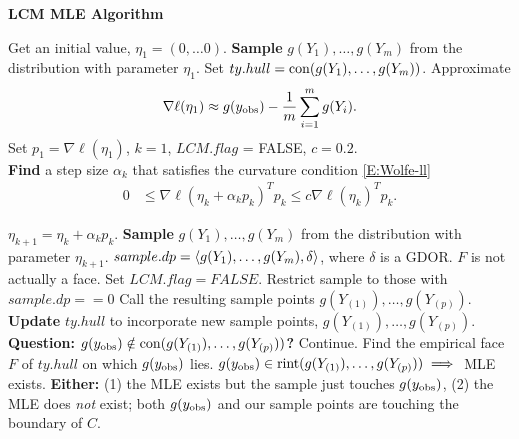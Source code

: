 {\small
\noindent \textbf{LCM MLE Algorithm}

\noindent \begin{algorithmic}[1]
\State Get an initial value, $\eta_1 = (0, \ldots 0)$.
\State \textbf{Sample} $g(Y_1), \ldots, g(Y_m)$ from the distribution with parameter $\eta_{1}$.  
\State Set $ty.hull = \operatorname{con}(g(Y_1), \ldots, g(Y_m) )$.
\State Approximate 
\begin{align*}
\nabla \ell( \eta_1) \approx g(y_{\text{obs}}) - \frac{1}{m}\sum_{i=1}^m g(Y_i).
\end{align*}
\State Set $p_1 = \nabla \ell( \eta_1)$, $k=1$, $LCM.flag$ = FALSE, $c=0.2$.\\

\State \textbf{Find} a step size $\alpha_k$ that satisfies the curvature condition \eqref{E:Wolfe-ll}
\begin{align*}%
	 0 & \leq \nabla \ell( \eta_k + \alpha_k p_k)^T p_k \leq c \nabla \ell(\eta_k)^T p_k.
\end{align*}

\State $\eta_{k+1} = \eta_k + \alpha_k p_k$.
\State \textbf{Sample} $g(Y_1), \ldots, g(Y_m)$ from the distribution with parameter $\eta_{k+1}$.
	\State $sample.dp = \langle  g(Y_1), \ldots, g(Y_m), \delta \rangle$, where $\delta$ is a GDOR.
		\State $F$ is not actually a face.  
		\State Set $LCM.flag = FALSE$.
	\Else
		\State Restrict sample to those with $sample.dp == 0$
	\EndIf
\EndIf
\State Call the resulting sample points $g(Y_{(1)}), \ldots, g(Y_{(p)})$.
\State \textbf{Update} $ty.hull$ to incorporate new sample points, $g(Y_{(1)}), \ldots, g(Y_{(p)})$.\\
\State \textbf{Question: $g(y_{\text{obs}}) \notin \operatorname{con}(g(Y_{(1)}), \ldots, g(Y_{(p)}) )$? }
	\State  Continue.  
	\State Find the empirical face $F$ of $ty.hull$ on which $g(y_{\text{obs}})$ lies.
		\State $g(y_{\text{obs}}) \in \operatorname{rint}( g(Y_{(1)}), \ldots, g(Y_{(p)}) ) \implies$ MLE exists.
		\State \textbf{Either:}
		\State (1) the MLE exists but the sample just touches $g(y_{\text{obs}})$, 
		\State (2) the MLE does \emph{not} exist; both $g(y_{\text{obs}})$ and our sample points  
		\State are touching the boundary of $C$.


\end{algorithmic}}

